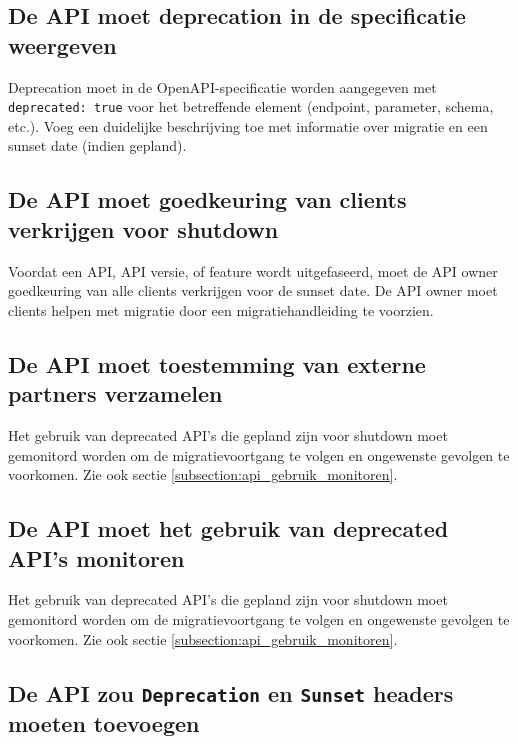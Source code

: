 \subsection{De API moet deprecation in de specificatie weergeven}
\label{subsection:deprecation_specificatie}

Deprecation moet in de OpenAPI-specificatie worden aangegeven met \texttt{deprecated: true} voor het betreffende element (endpoint, parameter, schema, etc.). Voeg een duidelijke beschrijving toe met informatie over migratie en een sunset date (indien gepland).

\subsection{De API moet goedkeuring van clients verkrijgen voor shutdown}
\label{subsection:goedkeuring_clients}

Voordat een API, API versie, of feature wordt uitgefaseerd, moet de API owner goedkeuring van alle clients verkrijgen voor de sunset date. De API owner moet clients helpen met migratie door een migratiehandleiding te voorzien.

\subsection{De API moet toestemming van externe partners verzamelen}
\label{subsection:toestemming_externe_partners}

Het gebruik van deprecated API's die gepland zijn voor shutdown moet gemonitord worden om de migratievoortgang te volgen en ongewenste gevolgen te voorkomen. Zie ook sectie \ref{subsection:api_gebruik_monitoren}.

\subsection{De API moet het gebruik van deprecated API's monitoren}
\label{subsection:monitoring_deprecated_api}

Het gebruik van deprecated API's die gepland zijn voor shutdown moet gemonitord worden om de migratievoortgang te volgen en ongewenste gevolgen te voorkomen. Zie ook sectie \ref{subsection:api_gebruik_monitoren}.

\subsection{De API zou \texttt{Deprecation} en \texttt{Sunset} headers moeten toevoegen}
\label{subsection:deprecation_sunset_headers}

